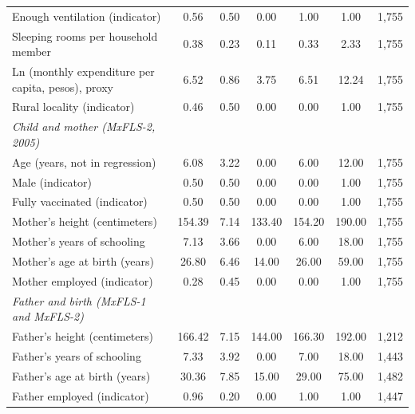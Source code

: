\documentclass[12pt]{article}
\begin{document}
\begin{longtable}{l*{6}{c}}
Enough ventilation (indicator)&        0.56&        0.50&        0.00&        1.00&        1.00&       1,755\\
Sleeping rooms per household member&        0.38&        0.23&        0.11&        0.33&        2.33&       1,755\\
Ln (monthly expenditure per capita, pesos), proxy&        6.52&        0.86&        3.75&        6.51&       12.24&       1,755\\
Rural locality (indicator)&        0.46&        0.50&        0.00&        0.00&        1.00&       1,755\\
\addlinespace[6pt]\textit{Child and mother (MxFLS-2, 2005)}&            &            &            &            &            &            \\
Age (years, not in regression)&        6.08&        3.22&        0.00&        6.00&       12.00&       1,755\\
Male (indicator)    &        0.50&        0.50&        0.00&        0.00&        1.00&       1,755\\
Fully vaccinated (indicator)&        0.50&        0.50&        0.00&        0.00&        1.00&       1,755\\
Mother's height (centimeters)&      154.39&        7.14&      133.40&      154.20&      190.00&       1,755\\
Mother's years of schooling&        7.13&        3.66&        0.00&        6.00&       18.00&       1,755\\
Mother's age at birth (years)&       26.80&        6.46&       14.00&       26.00&       59.00&       1,755\\
Mother employed (indicator)&        0.28&        0.45&        0.00&        0.00&        1.00&       1,755\\
\addlinespace[6pt]\textit{Father and birth (MxFLS-1 and MxFLS-2)}&            &            &            &            &            &            \\
Father's height (centimeters)&      166.42&        7.15&      144.00&      166.30&      192.00&       1,212\\
Father's years of schooling&        7.33&        3.92&        0.00&        7.00&       18.00&       1,443\\
Father's age at birth (years)&       30.36&        7.85&       15.00&       29.00&       75.00&       1,482\\
Father employed (indicator)&        0.96&        0.20&        0.00&        1.00&        1.00&       1,447\\

\end{longtable}
\end{document}
